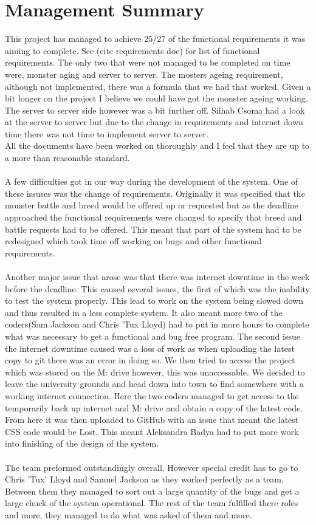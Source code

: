 \documentclass{project}
\begin{document}
\section{Management Summary}
This project has managed to achieve 25/27 of the functional requirements it was aiming to complete. See (cite requirements doc) for list of functional requirements. The only two that were not managed to be completed on time were, monster aging and server to server. The mosters ageing requirement, although not implemented, there was a formula that we had that worked. Given a bit longer on the project I believe we could have got the monster ageing working. The server to server side however was a bit further off. Silhab Csoma had a look at the server to server but due to the change in requirements and internet down time there was not time to implement server to server.
\\
All the documents have been worked on thoroughly and I feel that they are up to a more than reasonable standard.
\\
\\
A few difficulties got in our way during the development of the system. One of these issuses was the change of requirements. Originally it was specified that the monster battle and breed would be offered up or requested but as the deadline approached the functional requirements were changed to specify that breed and battle requests had to be offered. This meant that part of the system had to be redesigned which took time off working on bugs and other functional requirements. 
\\
\\
Another major issue that arose was that there was internet downtime in the week before the deadline. This caused several issues, the first of which was the inability to test the system properly. This lead to work on the system being slowed down and thus resulted in a less complete system. It also meant more two of the coders(Sam Jackson and Chris 'Tux Lloyd) had to put in more hours to complete what was necessary to get a functional and bug free program. 
The second issue the internet downtime caused was a loss of work as when uploading the latest copy to git there was an error in doing so. We then tried to access the project which was stored on the M: drive however, this was unaccessable. We decided to leave the university grounds and head down into town to find somewhere with a working internet connection. Here the two coders managed to get access to the temporarily back up internet and M: drive and obtain a copy of the latest code. From here it was then uploaded to GitHub with an issue that meant the latest CSS code would be Lost. This meant Aleksandra Badya had to put more work into finishing of the design of the system.  
\\
\\
The team preformed outstandingly overall. However special credit has to go to Chris 'Tux' Lloyd and Samuel Jackson as they worked perfectly as a team. Between them they managed to sort out a large quantity of the bugs and get a large chuck of the system operational. The rest of the team fulfilled there roles and more, they managed to do what was asked of them and more. 
\end{document}
